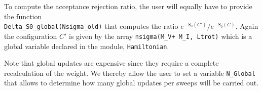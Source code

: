 To compute the acceptance rejection ratio,  the user  will equally have to provide the function \\
\texttt{Delta\_S0\_global(Nsigma\_old)} that computes the ratio $e^{-S_0(C')}/e^{-S_0(C)}$. Again the configuration $C'$ is   given by the array \texttt{nsigma(M\_V+ M\_I, Ltrot)}  which is 
a global variable declared in the module, \texttt{Hamiltonian}.

Note that global updates are expensive since they require a complete recalculation of the weight. We thereby  allow the user to set a variable \texttt{N\_Global} that allows to  determine how many global updates per sweeps will be carried out. 

 
 
